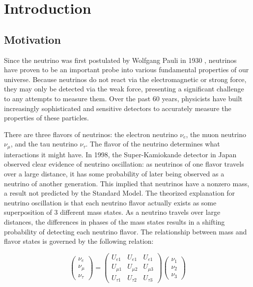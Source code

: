 
\chapter{Introduction}
\label{ch:Introduction}

\section{Motivation}

Since the neutrino was first postulated by Wolfgang Pauli in 1930 \cite{neutrinoHistory}, neutrinos have proven to be an important probe into various fundamental properties of our universe.
Because neutrinos do not react via the electromagnetic or strong force, they may only be detected via the weak force, presenting a significant challenge to any attempts to measure them.
Over the past 60 years, physicists have built increasingly sophisticated and sensitive detectors to accurately measure the properties of these particles.

There are three flavors of neutrinos: the electron neutrino $\nu_e$, the muon neutrino $\nu_\mu$, and the tau neutrino $\nu_\tau$.
The flavor of the neutrino determines what interactions it might have.
In 1998, the Super-Kamiokande detector in Japan observed clear evidence of neutrino oscillation: as neutrinos of one flavor travels over a large distance, it has some probability of later being observed as a neutrino of another generation.
This implied that neutrinos have a nonzero mass, a result not predicted by the Standard Model.
The theorized explanation for neutrino oscillation is that each neutrino flavor actually exists as some superposition of 3 different mass states. As a neutrino travels over large distances, the differences in phases of the mass states results in a shifting probability of detecting each neutrino flavor.
The relationship between mass and flavor states is governed by the following relation:

\[
\begin{pmatrix}
\nu_e \\ \nu_\mu \\ \nu_\tau
\end{pmatrix}
=
\begin{pmatrix}
U_{e1} & U_{e1} & U_{e1} \\ 
U_{\mu 1} & U_{\mu 2} & U_{\mu 3} \\
U_{\tau 1} & U_{\tau 2} & U_{\tau 3}
\end{pmatrix}
\begin{pmatrix}
\nu_1 \\ \nu_2 \\ \nu_3
\end{pmatrix}
\]


